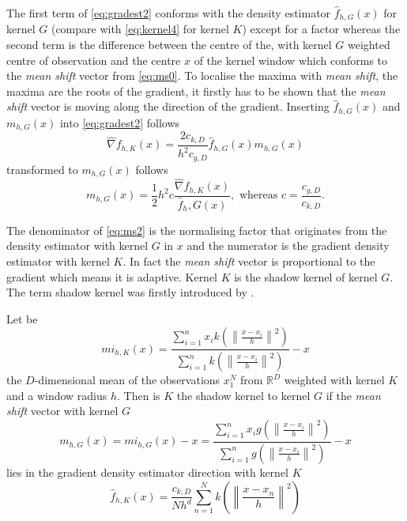 The first term of \autoref{eq:gradest2} conforms with the density
estimator $\hat{f}_{h,G}(x)$ for kernel $G$ (compare with
\autoref{eq:kernel4} for kernel $K$) except for a factor whereas the
second term is the difference between the centre of the, with kernel
$G$ weighted centre of observation and the centre $x$ of the kernel
window which conforms to the \emph{mean shift} vector from
\autoref{eq:ms0}.  To localise the maxima with \emph{mean shift}, the
maxima are the roots of the gradient, it firstly has to be shown that
the \emph{mean shift} vector is moving along the direction of the
gradient. Inserting $\hat{f}_{h,G}(x)$ and $m_{h,G}(x)$ into
\autoref{eq:gradest2} follows
\begin{equation}\label{eq:ms1}
  \hat{\nabla} f_{h,K}(x) = \frac{2c_{k,D}}{h^2c_{g,D}} 
  \hat{f}_{h,G}(x)m_{h,G}(x)
\end{equation}
transformed to $m_{h,G}(x)$ follows
\begin{equation}\label{eq:ms2}
  m_{h,G}(x) = \frac{1}{2}h^2 c 
  \frac{\hat{\nabla} f_{h,K}(x)}{\hat{f}_h,G(x)}, \textrm{ whereas } 
  c = \frac{c_{g,D}}{c_{k,D}}.
\end{equation}

The denominator of \autoref{eq:ms2} is the normalising factor that
originates from the density estimator with kernel $G$ in $x$ and the
numerator is the gradient density estimator with kernel $K$. In fact
the \emph{mean shift} vector is proportional to the gradient which
means it is adaptive. Kernel $K$ is the shadow kernel of kernel
$G$. The term shadow kernel was firstly introduced by
\citeauthor{citeulike:2522867} \citep{citeulike:2522867}.

Let be
\begin{equation}\label{eq:msi}
  mi_{h,K}(x) = \frac{\sum_{i=1}^n x_i k\left(\left\lVert \frac{x - x_i}{h}
      \right\rVert^2\right)}{\sum_{i=1}^n k\left(\left\lVert \frac{x - x_i}{h}
      \right\rVert^2\right)} -x
\end{equation}
the $D$-dimensional mean of the observations $x_1^N$ from
$\mathbb{R}^D$ weighted with kernel $K$ and a window radius $h$. Then
is $K$ the shadow kernel to kernel $G$ if the \emph{mean shift} vector
with kernel $G$
\begin{equation}\label{eq:msi2}
  m_{h,G}(x) = mi_{h,G}(x) - x = 
  \frac{\sum_{i=1}^n x_i g\left(\left\lVert \frac{x - x_i}{h}
      \right\rVert^2\right)}{\sum_{i=1}^n g\left(\left\lVert \frac{x - x_i}{h}
      \right\rVert^2\right)} -x
\end{equation}
lies in the gradient density estimator direction with kernel $K$
\begin{equation}\label{eq:msi3}
  \hat{f}_{h,K}(x) = \frac{c_{k,D}}{Nh^d}
  \sum_{n = 1}^N k\left(\left\lVert \frac{x-x_n}{h} \right\rVert^2\right)
\end{equation}

